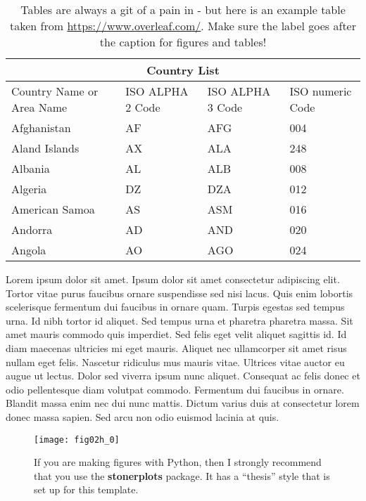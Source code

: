 \begin{table}
	\begin{center}
\begin{tabular}{ |p{3cm}||p{3cm}|p{3cm}|p{3cm}|  }
	\hline
	\multicolumn{4}{|c|}{Country List} \\
	\hline
	Country Name     or Area Name& ISO ALPHA 2 Code &ISO ALPHA 3 Code&ISO numeric Code\\
	\hline
	Afghanistan   & AF    &AFG&   004\\
	Aland Islands&   AX  & ALA   &248\\
	Albania &AL & ALB&  008\\
	Algeria    &DZ & DZA&  012\\
	American Samoa&   AS  & ASM&016\\
	Andorra& AD  & AND   &020\\
	Angola& AO  & AGO&024\\
	\hline
\end{tabular}
\caption{Tables are always a git of a pain in \LaTeXe - but here is an example table taken from \url{https://www.overleaf.com/}. Make sure the label goes after the caption for figures and tables!}
\label{tab:table_ex}
\end{center}	
\end{table}

Lorem ipsum dolor sit amet. Ipsum dolor sit amet consectetur adipiscing elit. Tortor vitae purus faucibus ornare suspendisse sed nisi lacus. Quis enim lobortis scelerisque fermentum dui faucibus in ornare quam. Turpis egestas sed tempus urna. Id nibh tortor id aliquet. Sed tempus urna et pharetra pharetra massa. Sit amet mauris commodo quis imperdiet. Sed felis eget velit aliquet sagittis id. Id diam maecenas ultricies mi eget mauris. Aliquet nec ullamcorper sit amet risus nullam eget felis. Nascetur ridiculus mus mauris vitae. Ultrices vitae auctor eu augue ut lectus. Dolor sed viverra ipsum nunc aliquet. Consequat ac felis donec et odio pellentesque diam volutpat commodo. Fermentum dui faucibus in ornare. Blandit massa enim nec dui nunc mattis. Dictum varius duis at consectetur lorem donec massa sapien. Sed arcu non odio euismod lacinia at quis.

\begin{figure}
	\centering
	\texttt{[image: fig02h\_0]}
	\caption{If you are making figures with Python, then I strongly recommend that you
		use the \textbf{stonerplots}\cite{stonerplots} package. It has a ``thesis'' style that is set up
		for this template.}
	\label{fig:fig_label}
\end{figure}

